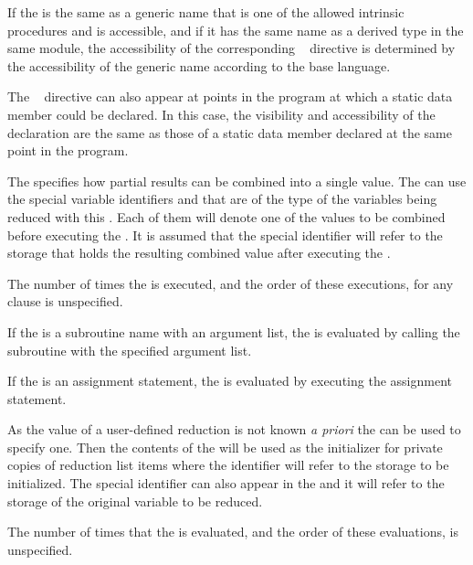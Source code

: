 {{{{If the  is the same as a generic name that is one of the allowed intrinsic procedures and is accessible, and if it has the same name as a derived type in the same module, the accessibility of the corresponding ~ directive is determined by the accessibility of the generic name according to the base language.
\fortranspecificend

\cppspecificstart
The ~ directive can also appear at points in the program at which 
a static data member could be declared. In this case, the visibility and accessibility of 
the declaration are the same as those of a static data member declared at the same point 
in the program.
\cppspecificend

The  specifies how partial results can be combined into a single value. The 
 can use the special variable identifiers  and  that are of the 
type of the variables being reduced with this . Each of them will 
denote one of the values to be combined before executing the . It is assumed 
that the special  identifier will refer to the storage that holds the resulting 
combined value after executing the .

The number of times the  is executed, and the order of these executions, for 
any  clause is unspecified.

\fortranspecificstart
If the  is a subroutine name with an argument list, the  is evaluated by 
calling the subroutine with the specified argument list.

If the  is an assignment statement, the  is evaluated by executing the 
assignment statement.
\fortranspecificend

As the  value of a user-defined reduction is not known \emph{a priori} the 
 can be used to specify one. Then the contents of the  
will be used as the initializer for private copies of reduction list items where the 
 identifier will refer to the storage to be initialized. The special identifier 
 can also appear in the  and it will refer to the storage of the 
original variable to be reduced.

The number of times that the  is evaluated, and the order of these 
evaluations, is unspecified.

}}}}
